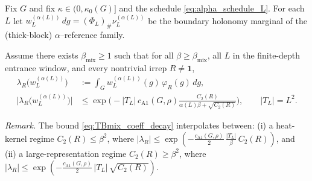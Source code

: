\begin{proposition}\label{prop:TBmix_coeff_decay_reference}
Fix $G$ and fix $\kappa\in(0,\kappa_0(G)]$ and the schedule \eqref{eq:alpha_schedule_L}.
For each $L$ let $w_L^{(\alpha(L))}\,dg = (\Phi_L)_{\#}\nu_L^{(\alpha(L))}$ be the boundary holonomy marginal of the
(thick-block) $\alpha$--reference family.

Assume there exists $\beta_{\mathrm{mix}}\ge 1$ such that for all $\beta\ge \beta_{\mathrm{mix}}$, all $L$ in the finite-depth entrance window,
and every nontrivial irrep $R\neq \mathbf 1$,
\begin{equation}\label{eq:TBmix_coeff_decay}
\begin{aligned}
\lambda_R\!\bigl(w_L^{(\alpha(L))}\bigr)
&:=\int_{G} w_L^{(\alpha(L))}(g)\,\varphi_R(g)\,dg,\\
\bigl|\lambda_R\!\bigl(w_L^{(\alpha(L))}\bigr)\bigr|
&\le
\exp\!\Big(-|T_L|\,c_{\mathrm{A1}}(G,\rho)
\frac{C_2(R)}{\alpha(L)\beta+\sqrt{C_2(R)}}\Big),
\qquad |T_L|=L^2.
\end{aligned}
\end{equation}

\noindent\emph{Remark.} The bound \eqref{eq:TBmix_coeff_decay} interpolates between: (i) a heat-kernel regime $C_2(R)\le \beta^2$, where
$|\lambda_R|\le \exp(-\tfrac{c_{\mathrm{A1}}(G,\rho)}{2}\,\tfrac{|T_L|}{\beta}\,C_2(R))$, and (ii) a large-representation regime $C_2(R)\ge \beta^2$, where
$|\lambda_R|\le \exp(-\tfrac{c_{\mathrm{A1}}(G,\rho)}{2}\,|T_L|\,\sqrt{C_2(R)})$.
\end{proposition}





